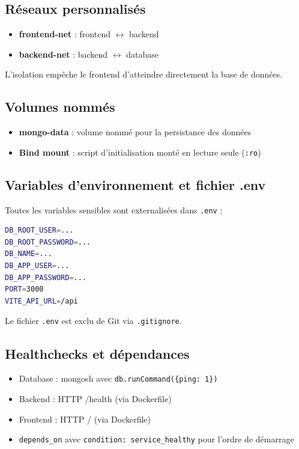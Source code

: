 \documentclass[12pt,a4paper]{report}
\begin{document}
\subsection{Réseaux personnalisés}
\begin{itemize}
\item \textbf{frontend-net} : frontend $\leftrightarrow$ backend
\item \textbf{backend-net} : backend $\leftrightarrow$ database
\end{itemize}
L'isolation empêche le frontend d'atteindre directement la base de données.

\subsection{Volumes nommés}
\begin{itemize}
\item \textbf{mongo-data} : volume nommé pour la persistance des données
\item \textbf{Bind mount} : script d'initialisation monté en lecture seule (\texttt{:ro})
\end{itemize}

\subsection{Variables d'environnement et fichier .env}

Toutes les variables sensibles sont externalisées dans \texttt{.env} :

\begin{lstlisting}[language=bash]
DB_ROOT_USER=...
DB_ROOT_PASSWORD=...
DB_NAME=...
DB_APP_USER=...
DB_APP_PASSWORD=...
PORT=3000
VITE_API_URL=/api
\end{lstlisting}

Le fichier \texttt{.env} est exclu de Git via \texttt{.gitignore}.

\subsection{Healthchecks et dépendances}
\begin{itemize}
\item Database : mongosh avec \texttt{db.runCommand(\{ping: 1\})}
\item Backend : HTTP /health (via Dockerfile)
\item Frontend : HTTP / (via Dockerfile)
\item \texttt{depends\_on} avec \texttt{condition: service\_healthy} pour l'ordre de démarrage
\end{itemize}
\end{document}
